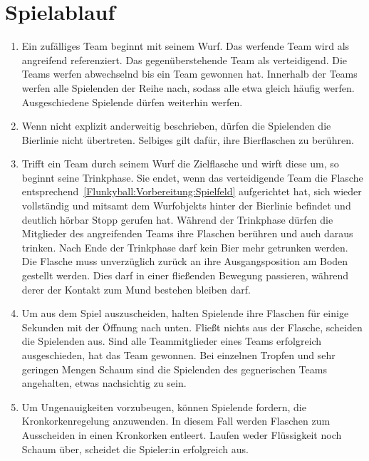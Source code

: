 \section{Spielablauf}
\begin{enumerate}[label={(\arabic*)}]    
    \item
    Ein zufälliges Team beginnt mit seinem Wurf.
    Das werfende Team wird als \glqq{}angreifend\grqq{} referenziert.
    Das gegenüberstehende Team als \glqq{}verteidigend\grqq{}.
    Die Teams werfen abwechselnd bis ein Team gewonnen hat.
    Innerhalb der Teams werfen alle Spielenden der Reihe nach, sodass alle etwa gleich häufig werfen.
    Ausgeschiedene Spielende dürfen weiterhin werfen.

    \item
    Wenn nicht explizit anderweitig beschrieben, dürfen die Spielenden die Bierlinie nicht übertreten.
    Selbiges gilt dafür, ihre Bierflaschen zu berühren.

    \item
    Trifft ein Team durch seinem Wurf die Zielflasche und wirft diese um, so beginnt seine Trinkphase.
    Sie endet, wenn das verteidigende Team die Flasche entsprechend~\ref{Flunkyball:Vorbereitung:Spielfeld} aufgerichtet hat, sich wieder vollständig und mitsamt dem Wurfobjekts hinter der Bierlinie befindet und deutlich hörbar \glqq{}Stopp\grqq{} gerufen hat.
    Während der Trinkphase dürfen die Mitglieder des angreifenden Teams ihre Flaschen berühren und auch daraus trinken.
    Nach Ende der Trinkphase darf kein Bier mehr getrunken werden.
    Die Flasche muss unverzüglich zurück an ihre Ausgangsposition am Boden gestellt werden.
    Dies darf in einer fließenden Bewegung passieren, während derer der Kontakt zum Mund bestehen bleiben darf.

    \item
    Um aus dem Spiel auszuscheiden, halten Spielende ihre Flaschen für einige Sekunden mit der Öffnung nach unten.
    Fließt nichts aus der Flasche, scheiden die Spielenden aus.
    Sind alle Teammitglieder eines Teams erfolgreich ausgeschieden, hat das Team gewonnen.
    Bei einzelnen Tropfen und sehr geringen Mengen Schaum sind die Spielenden des gegnerischen Teams angehalten, etwas nachsichtig zu sein.

    \item
    Um Ungenauigkeiten vorzubeugen, können Spielende fordern, die Kronkorkenregelung anzuwenden.
    In diesem Fall werden Flaschen zum Ausscheiden in einen Kronkorken entleert.
    Laufen weder Flüssigkeit noch Schaum über, scheidet die Spieler:in erfolgreich aus.
\end{enumerate}

